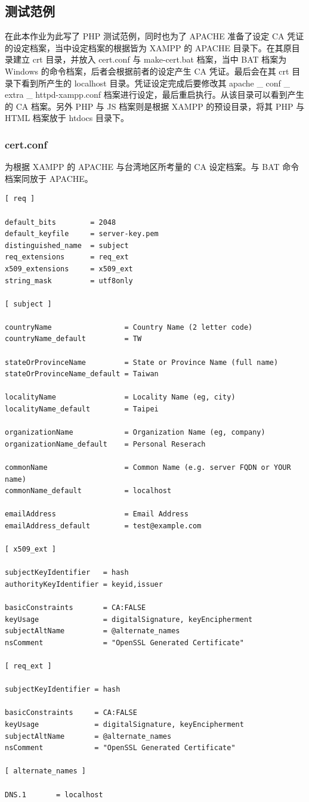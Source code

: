 \subsection{测试范例}

在此本作业为此写了 PHP 测试范例，同时也为了 APACHE 准备了设定 CA 凭证的设定档案，当中设定档案的根据皆为 XAMPP 的 APACHE 目录下。在其原目录建立 crt 目录，并放入 cert.conf 与 make-cert.bat 档案，当中 BAT 档案为 Windows 的命令档案，后者会根据前者的设定产生 CA 凭证。最后会在其 crt 目录下看到所产生的 localhost 目录。凭证设定完成后要修改其 apache \_ conf \_ extra \_ httpd-xampp.conf 档案进行设定，最后重启执行。从该目录可以看到产生的 CA 档案。另外 PHP 与 JS 档案则是根据 XAMPP 的预设目录，将其 PHP 与 HTML 档案放于 htdocs 目录下。

\subsubsection{cert.conf}

为根据 XAMPP 的 APACHE 与台湾地区所考量的 CA 设定档案。与 BAT 命令档案同放于 APACHE。

\begin{Verbatim}
[ req ]

default_bits        = 2048
default_keyfile     = server-key.pem
distinguished_name  = subject
req_extensions      = req_ext
x509_extensions     = x509_ext
string_mask         = utf8only

[ subject ]

countryName                 = Country Name (2 letter code)
countryName_default         = TW

stateOrProvinceName         = State or Province Name (full name)
stateOrProvinceName_default = Taiwan

localityName                = Locality Name (eg, city)
localityName_default        = Taipei

organizationName            = Organization Name (eg, company)
organizationName_default    = Personal Reserach

commonName                  = Common Name (e.g. server FQDN or YOUR name)
commonName_default          = localhost

emailAddress                = Email Address
emailAddress_default        = test@example.com

[ x509_ext ]

subjectKeyIdentifier   = hash
authorityKeyIdentifier = keyid,issuer

basicConstraints       = CA:FALSE
keyUsage               = digitalSignature, keyEncipherment
subjectAltName         = @alternate_names
nsComment              = "OpenSSL Generated Certificate"

[ req_ext ]

subjectKeyIdentifier = hash

basicConstraints     = CA:FALSE
keyUsage             = digitalSignature, keyEncipherment
subjectAltName       = @alternate_names
nsComment            = "OpenSSL Generated Certificate"

[ alternate_names ]

DNS.1       = localhost
\end{Verbatim}

